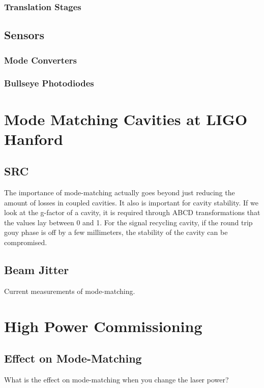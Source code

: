 \documentclass[10pt,a4paper]{book}
\begin{document}
		\subsection{Translation Stages}
		
	\section{Sensors}
		\subsection{Mode Converters}
		
		\subsection{Bullseye Photodiodes}

\chapter{Mode Matching Cavities at LIGO Hanford}
	\section{SRC}
	The importance of mode-matching actually goes beyond just reducing the amount of losses in coupled cavities.  It also is important for cavity stability.  If we look at the g-factor of a cavity, it is required through ABCD transformations that the values lay between 0 and 1.  For the signal recycling cavity, if the round trip gouy phase is off by a few millimeters, the stability of the cavity can be compromised. 
	
	\section{Beam Jitter}
	
Current measurements of mode-matching.

\chapter{High Power Commissioning}
	\section{Effect on Mode-Matching}
	What is the effect on mode-matching when you change the laser power?

\end{document}

